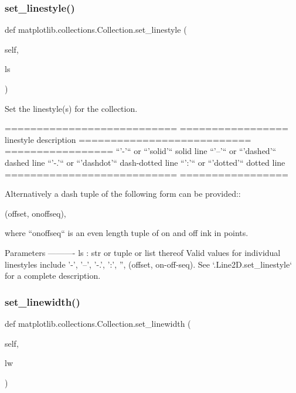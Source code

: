 \subsubsection{\texorpdfstring{set\+\_\+linestyle()}{set\_linestyle()}}
{\footnotesize\ttfamily def matplotlib.\+collections.\+Collection.\+set\+\_\+linestyle (\begin{DoxyParamCaption}\item[{}]{self,  }\item[{}]{ls }\end{DoxyParamCaption})}

\begin{DoxyVerb}Set the linestyle(s) for the collection.

===========================   =================
linestyle                     description
===========================   =================
``'-'`` or ``'solid'``        solid line
``'--'`` or  ``'dashed'``     dashed line
``'-.'`` or  ``'dashdot'``    dash-dotted line
``':'`` or ``'dotted'``       dotted line
===========================   =================

Alternatively a dash tuple of the following form can be provided::

    (offset, onoffseq),

where ``onoffseq`` is an even length tuple of on and off ink in points.

Parameters
----------
ls : str or tuple or list thereof
    Valid values for individual linestyles include {'-', '--', '-.',
    ':', '', (offset, on-off-seq)}. See `.Line2D.set_linestyle` for a
    complete description.
\end{DoxyVerb}
 \mbox{\label{classmatplotlib_1_1collections_1_1Collection_a44e7fd7155a2b44c97964f8004f8fbbe}} 
\subsubsection{\texorpdfstring{set\+\_\+linewidth()}{set\_linewidth()}}
{\footnotesize\ttfamily def matplotlib.\+collections.\+Collection.\+set\+\_\+linewidth (\begin{DoxyParamCaption}\item[{}]{self,  }\item[{}]{lw }\end{DoxyParamCaption})}

